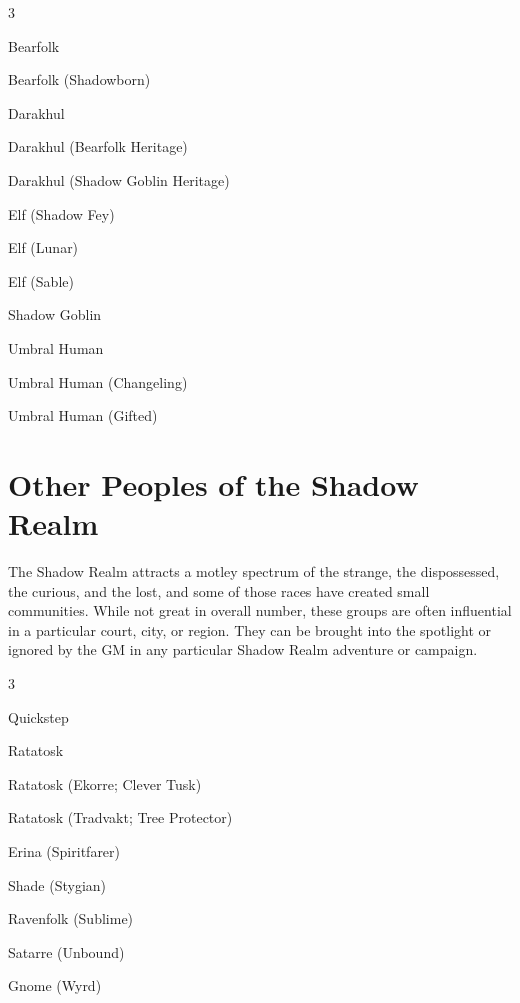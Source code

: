 \documentclass[10pt,a4paper,twoside,bg=print,twocolumn,openany,nodeprecatedcode]{dndbook}
\begin{document}
\begin{itemize}
\begin{multicols}{3}
\item Bearfolk
\item Bearfolk (Shadowborn)
\item Darakhul
\item Darakhul (Bearfolk Heritage)
\item Darakhul (Shadow Goblin Heritage)
\item Elf (Shadow Fey)
\item Elf (Lunar)
\item Elf (Sable)
\item Shadow Goblin
\item Umbral Human
\item Umbral Human (Changeling)
\item Umbral Human (Gifted)
\end{multicols}

\end{itemize}

\section{Other Peoples of the Shadow Realm}
The Shadow Realm attracts a motley spectrum of the strange, the dispossessed, the curious, and the lost, and some of those races have created small communities. While not great in overall number, these groups are often influential in a particular court, city, or region. They can be brought into the spotlight or ignored by the GM in any particular Shadow Realm adventure or campaign.


\begin{itemize}
\begin{multicols}{3}
\item Quickstep
\item Ratatosk
\item Ratatosk (Ekorre; Clever Tusk)
\item Ratatosk (Tradvakt; Tree Protector)
\item Erina (Spiritfarer)
\item Shade (Stygian)
\item Ravenfolk (Sublime)
\item Satarre (Unbound)
\item Gnome (Wyrd)
\end{multicols}

\end{itemize}
\end{document}
